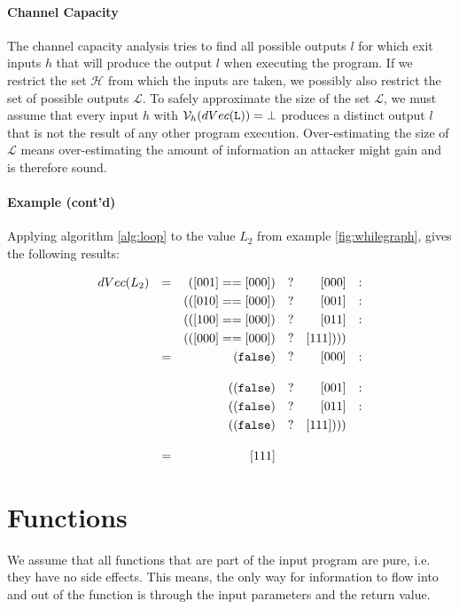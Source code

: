 \paragraph{Channel Capacity}
The channel capacity analysis tries to find all possible outputs $l$ for which exit inputs $h$ that will produce the output $l$ when executing the program. If we restrict the set $\mathcal{H}$ from which the inputs are taken, we possibly also restrict the set of possible outputs $\mathcal{L}$. To safely approximate the size of the set $\mathcal{L}$, we must assume that every input $h$ with $\mathcal{V}_h(dVec(\mathtt{L})) = \bot$ produces a distinct output $l$ that is not the result of any other program execution. Over-estimating the size of $\mathcal{L}$ means over-estimating the amount of information an attacker might gain and is therefore sound.


\paragraph{Example (cont'd)}
Applying algorithm \ref{alg:loop} to the value $L_2$ from example \ref{fig:whilegraph}, gives the following results:
\begin{center}
\begin{align*}
    dVec(L_2) && = &&([001] == [000]) && ? && [000] && : \\
        && && (([010] == [000]) && ? && [001] && : \\
        && && (([100] == [000]) && ? && [011] && : \\
        && && (([000] == [000]) && ? && [111]))) && \\
        && = && (\mathtt{false}) && ? && [000] && : \\[1em]
        && && ((\mathtt{false}) && ? && [001] && : \\
        && && ((\mathtt{false}) && ? && [011] && : \\
        && && ((\mathtt{false}) && ? && [111]))) && \\[1em]
        && = && [111]
    \end{align*}
\end{center}

\section{Functions}\label{sec:functions}
We assume that all functions that are part of the input program are pure, i.e. they have no side effects. This means, the only way for information to flow into and out of the function is through the input parameters and the return value.

